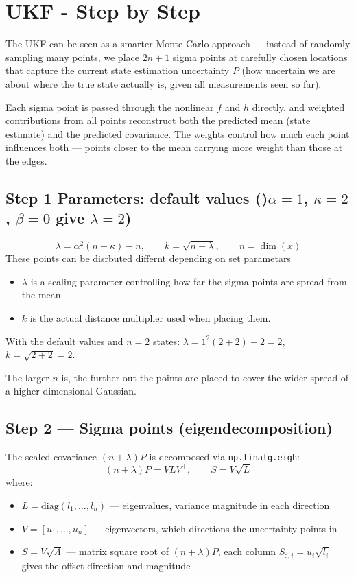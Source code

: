 \documentclass[12pt, a4paper]{article}
\begin{document}
\clearpage
\section*{UKF - Step by Step}
\vspace{-0.3cm}
The UKF can be seen as a smarter Monte Carlo approach --- instead of randomly
sampling many points, we place $2n+1$ sigma points at carefully chosen locations
that capture the current state estimation uncertainty $P$ (how uncertain we are
about where the true state actually is, given all measurements seen so far).

Each sigma point is passed through the nonlinear $f$ and $h$ directly, and
weighted contributions from all points reconstruct both the predicted mean
(state estimate) and the predicted covariance. The weights control how much
each point influences both --- points closer to the mean carrying more weight
than those at the edges.
\vspace{-0.4cm}
\subsection*{Step 1 Parameters: default values ()$\alpha=1$,
$\kappa=2$, $\beta=0$ give $\lambda = 2$)}
\vspace{-0.2cm}
\[
  \lambda = \alpha^2(n+\kappa) - n, \qquad
  k = \sqrt{n+\lambda}, \qquad
  n = \dim(x)
\]
These points can be disrbuted differnt depending on set parametars
\begin{itemize}
  \item $\lambda$ is a scaling parameter controlling how far the sigma points
are spread from the mean.
  \item $k$ is the actual distance multiplier used
  when placing them.
\end{itemize}
\begin{notebox}
  With the default values and $n=2$ states: $\lambda = 1^2(2+2)-2 = 2$, $k = \sqrt{2+2} = 2$.
\end{notebox}
\vspace{-0.3cm}
The larger $n$ is, the further out the points are placed to
cover the wider spread of a higher-dimensional Gaussian.
\vspace{-0.4cm}
\subsection*{Step 2 --- Sigma points (eigendecomposition)}
\vspace{-0.2cm}
The scaled covariance $(n+\lambda)P$ is decomposed via \texttt{np.linalg.eigh}:
\[
  (n+\lambda)P = V L V^\top, \qquad
  S = V\sqrt{L} 
\]
where:
\begin{itemize}[leftmargin=1.4em]
  \item $L = \text{diag}(l_1,\ldots,l_n)$ --- eigenvalues, variance magnitude in each direction
  \item $V = [u_1,\ldots,u_n]$ --- eigenvectors, which directions the uncertainty points in
  \item $S = V\sqrt{\Lambda}$ --- matrix square root of $(n+\lambda)P$,
        each column $S_{:,i} = u_i\sqrt{l_i}$ gives the offset direction and magnitude
\end{itemize}
\end{document}
